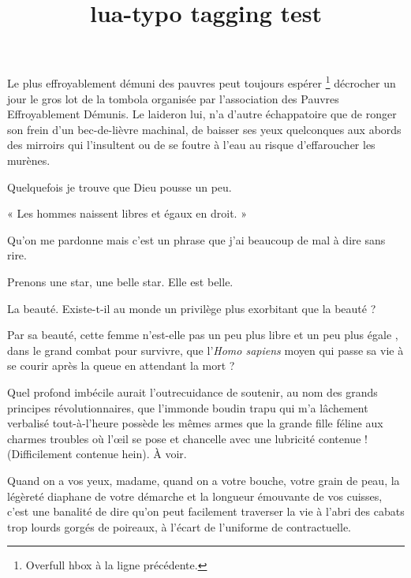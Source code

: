\documentclass[french,twoside]{article}
\title{lua-typo tagging test}
\begin{document}
Le plus effroyablement démuni des pauvres peut toujours espérer
\footnote{Overfull hbox  à la ligne précédente.}
décrocher un jour le gros lot de la tombola organisée par
l’association des Pauvres Effroyablement Démunis.
%
Le laideron lui, n’a d’autre échappatoire que de
ronger son frein d’un bec-de-lièvre machinal, de baisser ses yeux quelconques
aux abords des mirroirs qui l’insultent ou de se foutre à l’eau au risque
d’effaroucher les murènes.

Quelquefois je trouve que Dieu pousse un peu.

« Les hommes naissent libres et égaux en droit. »

Qu’on me pardonne mais c’est un phrase que j’ai beaucoup de mal à dire sans
rire. %

Prenons une star, une belle star. Elle est belle.

La beauté. Existe-t-il au monde un privilège plus exorbitant que la beauté ?

Par sa beauté, cette femme n’est-elle pas un peu plus libre
et un peu plus égale , dans le grand combat pour survivre,
que l’\textit{Homo sapiens} moyen qui passe sa vie à se courir
après la queue en attendant la mort ?

Quel profond imbécile aurait l’outrecuidance de soutenir, au nom des grands
principes révolutionnaires, que l’immonde boudin trapu qui m’a
lâchement verbalisé
tout-à-l’heure
possède les mêmes armes
que la grande fille féline aux charmes troubles où l’œil se
pose et chancelle avec une lubricité contenue !
(Difficilement contenue hein). À voir.

Quand on a vos yeux, madame, quand on a votre bouche, votre grain de peau, la
légèreté diaphane de votre démarche et la longueur émouvante de vos cuisses,
c’est une banalité de dire qu’on peut facilement traverser la vie %
à l’abri des cabats trop lourds gorgés de poireaux, à l’écart de l’uniforme de
contractuelle.
\end{document}
